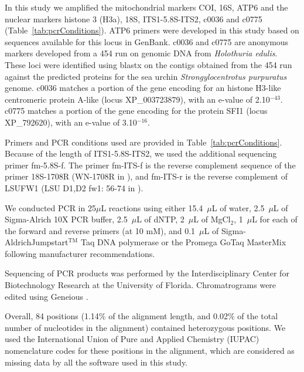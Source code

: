 \documentclass[12pt,letterpaper]{article}\usepackage[]{graphicx}\usepackage[]{color}
\begin{document}
In this study we amplified the mitochondrial markers COI, 16S, ATP6 and the
nuclear markers histone 3 (H3a), 18S, ITS1-5.8S-ITS2, c0036 and c0775
(Table~\ref{tab:pcrConditions}). ATP6 primers were developed in this study based
on sequences available for this locus in GenBank. c0036 and c0775 are anonymous
markers developed from a 454 run on genomic DNA from \textit{Holothuria edulis}.
These loci were identified using blastx on the contigs obtained from the 454 run
against the predicted proteins for the sea urchin \textit{Strongylocentrotus
  purpuratus} genome. c0036 matches a portion of the gene encoding for an
histone H3-like centromeric protein A-like (locus XP\_003723879), with an
e-value of 2.10$^{-43}$. c0775 matches a portion of the gene encoding for the
protein SFI1 (locus XP\_792620), with an e-value of 3.10$^{-16}$.

Primers and PCR conditions used are provided in
Table~\ref{tab:pcrConditions}. Because of the length of ITS1-5.8S-ITS2, we used
the additional sequencing primer fm-5.8S-f. The primer fm-ITS-f is the reverse
complement sequence of the primer 18S-1708R (WN-1708R in \citep{Lacey2005}), and
fm-ITS-r is the reverse complement of LSUFW1 (LSU D1,D2 fw1: 56-74 in
\citep{Sonnenberg2007}).

We conducted PCR in 25$\mu$L reactions using either 15.4~$\mu$L of water,
2.5~$\mu$L of Sigma-Alrich \textregistered 10X PCR buffer, 2.5~$\mu$L of dNTP,
2~$\mu$L of MgCl$_2$, 1~$\mu$L for each of the forward and reverse primers (at
10 mM), and 0.1~$\mu$L of Sigma-Aldrich\textregistered Jumpstart$^{\text{TM}}$
Taq DNA polymerase or the Promega GoTaq MasterMix following manufacturer
recommendations.

Sequencing of PCR products was performed by the Interdisciplinary Center for
Biotechnology Research at the University of Florida. Chromatrograms were edited
using Geneious \citep{Geneious558}.

Overall, 84 positions
(1.14\% of the alignment length,
and 0.02\% of the total number of
nucleotides in the alignment) contained heterozygous positions. We used the
International Union of Pure and Applied Chemistry (IUPAC) nomenclature codes for
these positions in the alignment, which are considered as missing data by all
the software used in this study.
\end{document}
